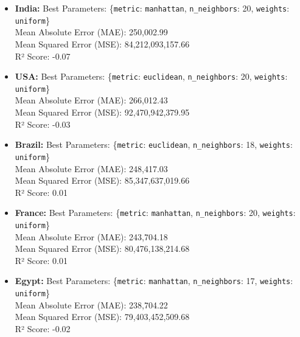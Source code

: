 \documentclass{article}
\begin{document}
\begin{itemize}
    \item \textbf{India:}
    Best Parameters: \{\texttt{metric}: \texttt{manhattan}, \texttt{n\_neighbors}: 20, \texttt{weights}: \texttt{uniform}\} \\
    Mean Absolute Error (MAE): 250,002.99 \\
    Mean Squared Error (MSE): 84,212,093,157.66 \\
    R² Score: -0.07 \\

    \item \textbf{USA:}
    Best Parameters: \{\texttt{metric}: \texttt{euclidean}, \texttt{n\_neighbors}: 20, \texttt{weights}: \texttt{uniform}\} \\
    Mean Absolute Error (MAE): 266,012.43 \\
    Mean Squared Error (MSE): 92,470,942,379.95 \\
    R² Score: -0.03 \\

    \item \textbf{Brazil:}
    Best Parameters: \{\texttt{metric}: \texttt{euclidean}, \texttt{n\_neighbors}: 18, \texttt{weights}: \texttt{uniform}\} \\
    Mean Absolute Error (MAE): 248,417.03 \\
    Mean Squared Error (MSE): 85,347,637,019.66 \\
    R² Score: 0.01 \\

    \item \textbf{France:}
    Best Parameters: \{\texttt{metric}: \texttt{manhattan}, \texttt{n\_neighbors}: 20, \texttt{weights}: \texttt{uniform}\} \\
    Mean Absolute Error (MAE): 243,704.18 \\
    Mean Squared Error (MSE): 80,476,138,214.68 \\
    R² Score: 0.01 \\

    \item \textbf{Egypt:}
    Best Parameters: \{\texttt{metric}: \texttt{manhattan}, \texttt{n\_neighbors}: 17, \texttt{weights}: \texttt{uniform}\} \\
    Mean Absolute Error (MAE): 238,704.22 \\
    Mean Squared Error (MSE): 79,403,452,509.68 \\
    R² Score: -0.02 \\


\end{itemize}
\end{document}
